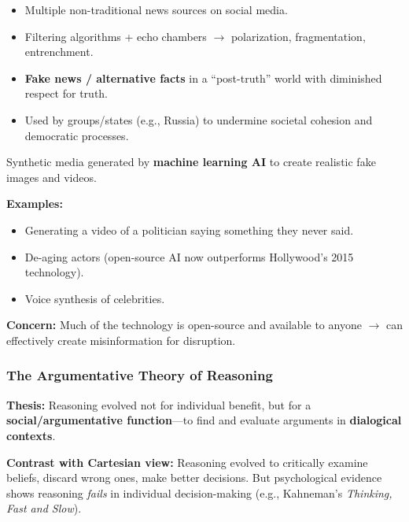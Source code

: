 \begin{keybox}
\begin{itemize}
  \item Multiple non-traditional news sources on social media.
  \item Filtering algorithms + echo chambers $\to$ polarization, fragmentation, entrenchment.
  \item \textbf{Fake news / alternative facts} in a ``post-truth'' world with diminished respect for truth.
  \item Used by groups/states (e.g., Russia) to undermine societal cohesion and democratic processes.
\end{itemize}
\end{keybox}

\begin{defbox}
Synthetic media generated by \textbf{machine learning AI} to create realistic fake images and videos.

\textbf{Examples:}
\begin{itemize}
  \item Generating a video of a politician saying something they never said.
  \item De-aging actors (open-source AI now outperforms Hollywood's 2015 technology).
  \item Voice synthesis of celebrities.
\end{itemize}

\textbf{Concern:} Much of the technology is open-source and available to anyone $\to$ can effectively create misinformation for disruption.
\end{defbox}

\bigseparator

\subsubsection{The Argumentative Theory of Reasoning}

\begin{keybox}
\textbf{Thesis:} Reasoning evolved not for individual benefit, but for a \textbf{social/argumentative function}---to find and evaluate arguments in \textbf{dialogical contexts}.

\textbf{Contrast with Cartesian view:} Reasoning evolved to critically examine beliefs, discard wrong ones, make better decisions. But psychological evidence shows reasoning \textit{fails} in individual decision-making (e.g., Kahneman's \textit{Thinking, Fast and Slow}).
\end{keybox}

